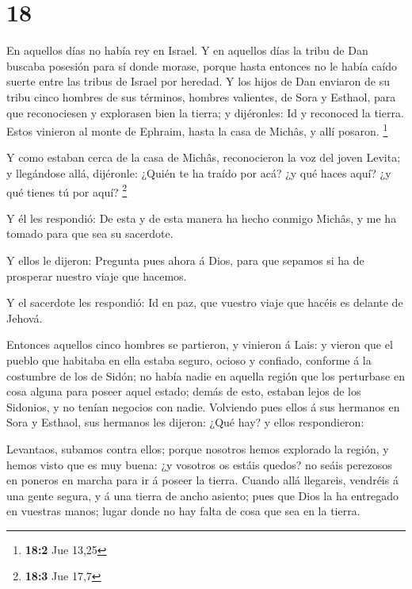 \hypertarget{section-17}{%
\section{18}\label{section-17}}

 En aquellos días no había rey en Israel. Y en aquellos
días la tribu de Dan buscaba posesión para sí donde morase, porque hasta
entonces no le había caído suerte entre las tribus de Israel por
heredad.  Y los hijos de Dan enviaron de su tribu cinco
hombres de sus términos, hombres valientes, de Sora y Esthaol, para que
reconociesen y explorasen bien la tierra; y dijéronles: Id y reconoced
la tierra. Estos vinieron al monte de Ephraim, hasta la casa de Michâs,
y allí posaron. \footnote{\textbf{18:2} Jue 13,25}

 Y como estaban cerca de la casa de Michâs, reconocieron
la voz del joven Levita; y llegándose allá, dijéronle: ¿Quién te ha
traído por acá? ¿y qué haces aquí? ¿y qué tienes tú por aquí?
\footnote{\textbf{18:3} Jue 17,7}

 Y él les respondió: De esta y de esta manera ha hecho
conmigo Michâs, y me ha tomado para que sea su sacerdote.

 Y ellos le dijeron: Pregunta pues ahora á Dios, para que
sepamos si ha de prosperar nuestro viaje que hacemos.

 Y el sacerdote les respondió: Id en paz, que vuestro
viaje que hacéis es delante de Jehová.

 Entonces aquellos cinco hombres se partieron, y vinieron
á Lais: y vieron que el pueblo que habitaba en ella estaba seguro,
ocioso y confiado, conforme á la costumbre de los de Sidón; no había
nadie en aquella región que los perturbase en cosa alguna para poseer
aquel estado; demás de esto, estaban lejos de los Sidonios, y no tenían
negocios con nadie.  Volviendo pues ellos á sus hermanos
en Sora y Esthaol, sus hermanos les dijeron: ¿Qué hay? y ellos
respondieron:

 Levantaos, subamos contra ellos; porque nosotros hemos
explorado la región, y hemos visto que es muy buena: ¿y vosotros os
estáis quedos? no seáis perezosos en poneros en marcha para ir á poseer
la tierra.  Cuando allá llegareis, vendréis á una gente
segura, y á una tierra de ancho asiento; pues que Dios la ha entregado
en vuestras manos; lugar donde no hay falta de cosa que sea en la
tierra.

